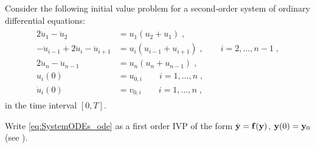 \begin{problem} \label{prb:SystemODEs}

Consider the following initial value problem for a second-order  system of 
ordinary differential equations:
\begin{gather}
  \label{eq:SystemODEs_ode}
\begin{aligned}
2\ddot u_1-\ddot u_2  &= u_1(u_2+u_1)\;,\\
-\ddot u_{i-1} + 2\ddot u_i-\ddot u_{i+1}  &= u_i(u_{i-1}+u_{i+1})\;,
\qquad i=2,\ldots,n-1\;,\\
2\ddot u_n-\ddot u_{n-1}  &= u_n(u_n+u_{n-1})\;,\\
u_i(0) &= u_{0,i} \qquad i=1,\ldots,n\;,\\
\dot u_i(0) &= v_{0,i} \qquad i=1,\ldots,n\;,
\end{aligned}
\end{gather}
in the time interval $[0,T]$.



\begin{subproblem}[3] \label{subprb:SystemODEs_1}
Write \eqref{eq:SystemODEs_ode} as a first order IVP of the form $\dot {{\mathbf{y}}} = {\mathbf{f}}({\mathbf{y}})$, ${\mathbf{y}}(0)={\mathbf{y}}_0$ (see ).



\end{subproblem}
\end{problem}
